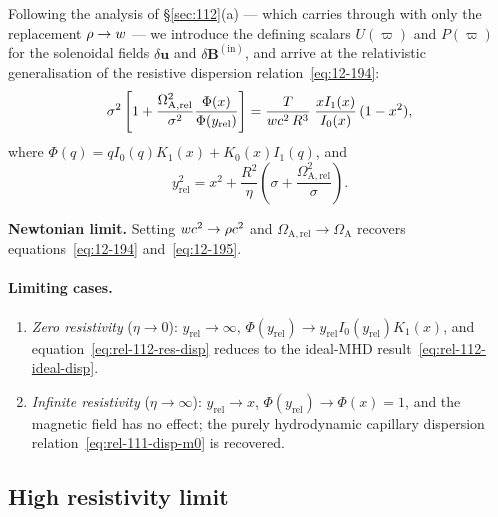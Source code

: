 Following the analysis of \S\ref{sec:112}(a) --- which carries
through with only the replacement $\rho \to w$ --- we
introduce the defining scalars $U(\varpi)$ and $P(\varpi)$ for the
solenoidal fields $\delta\mathbf{u}$ and $\delta\mathbf{B}^{(\mathrm{in})}$,
and arrive at the relativistic generalisation of the resistive
dispersion relation~\eqref{eq:12-194}:
\begin{equation}
\label{eq:rel-112-res-disp}
\sigma^{2}\left[1 + \frac{\Omega_{\mathrm{A,rel}}^{2}}{\sigma^{2}}
  \frac{\Phi(x)}{\Phi(y_{\mathrm{rel}})}\right]
  = \frac{T}{w c^{2}\,R^{3}}\;
  \frac{xI_{1}(x)}{I_{0}(x)}\,(1-x^{2}),
\end{equation}
where $\Phi(q) = qI_{0}(q)K_{1}(x) + K_{0}(x)I_{1}(q)$, and
\begin{equation}
\label{eq:rel-112-yrel}
y_{\mathrm{rel}}^{2} = x^{2}
  + \frac{R^{2}}{\eta}\left(\sigma
  + \frac{\Omega_{\mathrm{A,rel}}^{2}}{\sigma}\right).
\end{equation}

\begin{relcorrection}
\textbf{Newtonian limit.}
Setting $w c^{2} \to \rho c^{2}$ and
$\Omega_{\mathrm{A,rel}} \to \Omega_{\mathrm{A}}$ recovers
equations~\eqref{eq:12-194} and~\eqref{eq:12-195}.
\end{relcorrection}

\paragraph{Limiting cases.}
\begin{enumerate}
\item \emph{Zero resistivity} ($\eta \to 0$):
  $y_{\mathrm{rel}} \to \infty$,
  $\Phi(y_{\mathrm{rel}}) \to y_{\mathrm{rel}}
  I_{0}(y_{\mathrm{rel}})K_{1}(x)$, and
  equation~\eqref{eq:rel-112-res-disp} reduces to the ideal-MHD
  result~\eqref{eq:rel-112-ideal-disp}.
\item \emph{Infinite resistivity} ($\eta \to \infty$):
  $y_{\mathrm{rel}} \to x$, $\Phi(y_{\mathrm{rel}}) \to \Phi(x) = 1$,
  and the magnetic field has no effect; the purely hydrodynamic
  capillary dispersion relation~\eqref{eq:rel-111-disp-m0} is
  recovered.
\end{enumerate}

\subsection{High resistivity limit}
\label{sec:rel-112-highres}

